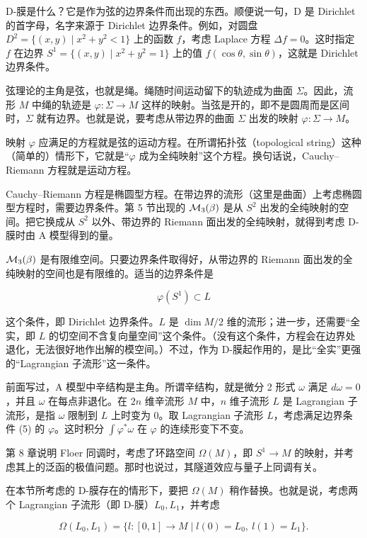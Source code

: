 D-膜是什么？它是作为弦的边界条件而出现的东西。顺便说一句，D 是 Dirichlet 的首字母，名字来源于 Dirichlet 边界条件。例如，对圆盘 $D^2 = \{(x,y)\mid x^2+y^2<1\}$ 上的函数 $f$，考虑 Laplace 方程 $\Delta f = 0$。这时指定 $f$ 在边界 $S^1 = \{(x,y)\mid x^2+y^2=1\}$ 上的值 $f(\cos\theta,\sin\theta)$，这就是 Dirichlet 边界条件。

弦理论的主角是弦，也就是绳。绳随时间运动留下的轨迹成为曲面 $\Sigma$。因此，流形 $M$ 中绳的轨迹是
$\varphi : \Sigma \to M$ 这样的映射。当弦是开的，即不是圆周而是区间时，$\Sigma$ 就有边界。也就是说，要考虑从带边界的曲面 $\Sigma$ 出发的映射 $\varphi : \Sigma \to M$。

映射 $\varphi$ 应满足的方程就是弦的运动方程。在所谓拓扑弦（topological string）这种（简单的）情形下，它就是“$\varphi$ 成为全纯映射”这个方程。换句话说，Cauchy--Riemann 方程就是运动方程。

Cauchy--Riemann 方程是椭圆型方程。在带边界的流形（这里是曲面）上考虑椭圆型方程时，需要边界条件。第 5 节出现的 $\mathcal{M}_3(\beta)$ 是从 $S^2$ 出发的全纯映射的空间。把它换成从 $S^2$ 以外、带边界的 Riemann 面出发的全纯映射，就得到考虑 D-膜时由 A 模型得到的量。

$\mathcal{M}_3(\beta)$ 是有限维空间。只要边界条件取得好，从带边界的 Riemann 面出发的全纯映射的空间也是有限维的。适当的边界条件是

\[
  \varphi(S^1) \subset L \tag{5}
\]

这个条件，即 Dirichlet 边界条件。$L$ 是 $\dim M/2$ 维的流形；进一步，还需要“全实，即 $L$ 的切空间不含复向量空间”这个条件。（没有这个条件，方程会在边界处退化，无法很好地作出解的模空间。）不过，作为 D-膜起作用的，是比“全实”更强的“Lagrangian 子流形”这一条件。

前面写过，A 模型中辛结构是主角。所谓辛结构，就是微分 2 形式 $\omega$ 满足 $d\omega = 0$，并且 $\omega$ 在每点非退化。在 $2n$ 维辛流形 $M$ 中，$n$ 维子流形 $L$ 是 Lagrangian 子流形，是指 $\omega$ 限制到 $L$ 上时变为 0。取 Lagrangian 子流形 $L$，考虑满足边界条件 (5) 的 $\varphi$。这时积分 $\int\varphi^*\omega$ 在 $\varphi$ 的连续形变下不变。

第 8 章说明 Floer 同调时，考虑了环路空间 $\Omega(M)$，即 $S^1 \to M$ 的映射，并考虑其上的泛函的极值问题。那时也说过，其隧道效应与量子上同调有关。

在本节所考虑的 D-膜存在的情形下，要把 $\Omega(M)$ 稍作替换。也就是说，考虑两个 Lagrangian 子流形（即 D-膜）$L_0,L_1$，并考虑

\[
  \Omega(L_0,L_1) = \{ l : [0,1]\to M \mid l(0) = L_0,\ l(1) = L_1 \} .
\]

